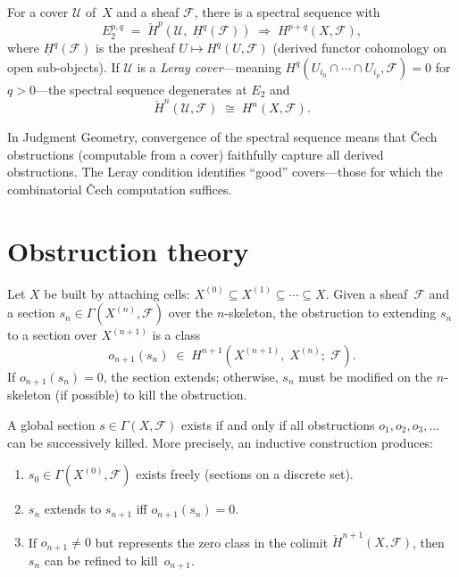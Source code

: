 \begin{theorem}
\label{thm:cech-derived}
For a cover $\mathcal{U}$ of~$X$ and a sheaf $\mathcal{F}$, there is a
spectral sequence with
\[
  E_2^{p,q}
  \;=\;
  \check{H}^p\!\left(\mathcal{U},\;
  \underline{H}^q(\mathcal{F})\right)
  \;\Longrightarrow\;
  H^{p+q}(X, \mathcal{F}),
\]
where $\underline{H}^q(\mathcal{F})$ is the presheaf
$U \mapsto H^q(U, \mathcal{F})$ (derived functor cohomology on open
sub-objects).  If $\mathcal{U}$ is a \emph{Leray cover}---meaning
$H^q(U_{i_0} \cap \cdots \cap U_{i_p}, \mathcal{F}) = 0$ for
$q > 0$---the spectral sequence degenerates at $E_2$ and
\[
  \check{H}^n(\mathcal{U}, \mathcal{F})
  \;\cong\; H^n(X, \mathcal{F}).
\]
\end{theorem}

\begin{remark}
In Judgment Geometry, convergence of the spectral sequence means that
\v{C}ech obstructions (computable from a cover) faithfully capture all
derived obstructions.  The Leray condition identifies ``good''
covers---those for which the combinatorial \v{C}ech computation suffices.
\end{remark}

\section{Obstruction theory}
\label{sec:obstruction}

\begin{construction}
\label{con:obstruction-tower}
Let $X$ be built by attaching cells: $X^{(0)} \subseteq X^{(1)}
\subseteq \cdots \subseteq X$.  Given a sheaf~$\mathcal{F}$ and a
section $s_n \in \Gamma(X^{(n)}, \mathcal{F})$ over the $n$-skeleton,
the obstruction to extending $s_n$ to a section over $X^{(n+1)}$ is a
class
\[
  o_{n+1}(s_n) \;\in\; H^{n+1}(X^{(n+1)},\; X^{(n)};\; \mathcal{F}).
\]
If $o_{n+1}(s_n) = 0$, the section extends; otherwise, $s_n$ must be
modified on the $n$-skeleton (if possible) to kill the obstruction.
\end{construction}

\begin{proposition}
\label{prop:systematic-obstruction}
A global section $s \in \Gamma(X, \mathcal{F})$ exists if and only if
all obstructions $o_1, o_2, o_3, \ldots$ can be successively killed.
More precisely, an inductive construction produces:
\begin{enumerate}[label=(\alph*),nosep]
\item $s_0 \in \Gamma(X^{(0)}, \mathcal{F})$ exists freely
  (sections on a discrete set).
\item $s_n$ extends to $s_{n+1}$ iff $o_{n+1}(s_n) = 0$.
\item If $o_{n+1} \neq 0$ but represents the zero class in the
  colimit $\check{H}^{n+1}(X, \mathcal{F})$, then $s_n$ can be
  refined to kill~$o_{n+1}$.
\end{enumerate}
\end{proposition}

